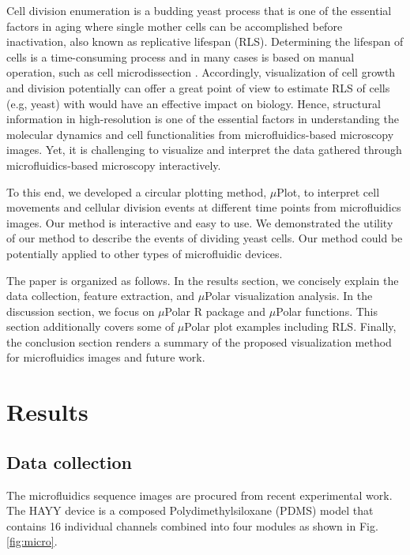 \documentclass[conference]{IEEEtran}
\begin{document}
Cell division enumeration is a budding yeast process that is one of the essential factors in aging where single mother cells can be accomplished before inactivation, also known as replicative lifespan (RLS). Determining the lifespan of cells is a time-consuming process and in many cases is based on manual operation, such as cell microdissection \cite{ref08}. Accordingly, visualization of cell growth and division potentially can offer a great point of view to estimate RLS of cells (e.g, yeast) with would have an effective impact on biology. Hence, structural information in high-resolution is one of the essential factors in understanding the molecular dynamics and cell functionalities from microfluidics-based microscopy images. Yet, it is challenging to visualize and interpret the data gathered through microfluidics-based microscopy interactively.

To this end, we developed a circular plotting method, $\mu$Plot, to interpret cell movements and cellular division events at different time points from microfluidics images. Our method is interactive and easy to use. We demonstrated the utility of our method to describe the events of dividing yeast cells. Our method could be potentially applied to other types of microfluidic devices.


The paper is organized as follows. In the results section, we concisely explain the data collection, feature extraction, and $\mu$Polar visualization analysis. In the discussion section, we focus on $\mu$Polar R package and $\mu$Polar functions. This section additionally covers some of $\mu$Polar plot examples including RLS. Finally, the conclusion section renders a summary of the proposed visualization method for microfluidics images and future work.

 

\section{Results}

\subsection*{Data collection}
The microfluidics sequence images are procured from \cite{ref13} recent experimental work. The HAYY device is a composed Polydimethylsiloxane (PDMS) model that contains 16 individual channels combined into four modules as shown in Fig.\ref{fig:micro}.
\end{document}

